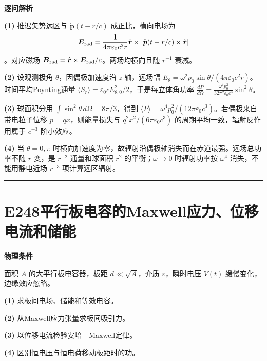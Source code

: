 \documentclass[UTF8,a4paper,11pt,oneside,openany]{ctexbook}
\begin{document}
\par\medskip\noindent\textbf{逐问解析}
\par\noindent\textbf{(1)} 推迟矢势远区与 \(\dot{\boldsymbol p}(t-r/c)\) 成正比，横向电场为 \[\boldsymbol E_{\rm rad}=\frac{1}{4\pi\varepsilon_0c^2r}\hat{\boldsymbol r}\times[\ddot{\boldsymbol p}(t-r/c)\times\hat{\boldsymbol r}]\]。对应磁场 \(\boldsymbol B_{\rm rad}=\hat{\boldsymbol r}\times\boldsymbol E_{\rm rad}/c\)。两场均横向且随 \(r^{-1}\) 衰减。
\par\noindent\textbf{(2)} 设观测极角 \(\theta\)，因偶极加速度沿 \(z\) 轴，远场幅 \(E_\theta=\omega^2p_0\sin\theta/(4\pi\varepsilon_0c^2r)\)。时间平均Poynting通量 \(\langle S_r\rangle=\varepsilon_0 cE_{\theta,0}^2/2\)，于是每立体角功率 \(\frac{dP}{d\Omega}=\frac{\omega^4p_0^2}{32\pi^2\varepsilon_0c^3}\sin^2\theta\)。
\par\noindent\textbf{(3)} 球面积分用 \(\int\sin^2\theta\,d\Omega=8\pi/3\)，得到 \(\langle P\rangle=\omega^4p_0^2/(12\pi\varepsilon_0c^3)\)。若偶极来自带电粒子位移 \(p=qx\)，则能量损失与 \(q^2\ddot x^2/(6\pi\varepsilon_0c^3)\) 的周期平均一致，辐射反作用属于 \(c^{-3}\) 阶小效应。
\par\noindent\textbf{(4)} 当 \(\theta=0,\pi\) 时横向加速度为零，故辐射沿偶极轴消失而在赤道最强。远场总功率不随 \(r\) 变，是 \(r^{-2}\) 通量和球面积 \(r^2\) 的平衡；\(\omega\to0\) 时辐射功率按 \(\omega^4\) 消失，不能用静电近场 \(r^{-3}\) 项计算远区辐射。

\par\bigskip\hrule\bigskip
\section*{E248\quad 平行板电容的Maxwell应力、位移电流和储能}
\textbf{物理条件}\par 面积 \(A\) 的大平行板电容器，板距 \(d\ll\sqrt A\)，介质 \(\varepsilon\)，瞬时电压 \(V(t)\) 缓慢变化，边缘效应忽略。
\par\noindent\textbf{(1)} 求板间电场、储能和等效电容。
\par\noindent\textbf{(2)} 从Maxwell应力张量求板间吸引力。
\par\noindent\textbf{(3)} 以位移电流检验安培—Maxwell定律。
\par\noindent\textbf{(4)} 区别恒电压与恒电荷移动板距时的功。
\end{document}
